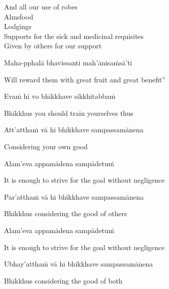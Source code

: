 \begin{english-verses}
  And all our use of robes\\
  Almsfood\\
  Lodgings\\
  Supports for the sick and medicinal requisites\makeatletter\hyperlink{endnote92-appendix}\makeatother\\
  Given by others for our support
\end{english-verses}

Maha-pphalā bhavissanti mah'ānisaṁsā'ti

\begin{english}
  Will reward them with great fruit and great benefit''
\end{english}

Evaṁ hi vo bhikkhave sikkhitabbaṁ

\begin{english}
  Bhikkhus you should train yourselves thus
\end{english}

Att'atthaṁ vā hi bhikkhave sampassamānena

\begin{english}
  Considering your own good
\end{english}

Alam'eva appamādena sampādetuṁ

\begin{english}
  It is enough to strive for the goal without negligence
\end{english}

Par'atthaṁ vā hi bhikkhave sampassamānena

\begin{english}
  Bhikkhus considering the good of others
\end{english}

Alam'eva appamādena sampādetuṁ

\begin{english}
  It is enough to strive for the goal without negligence
\end{english}

Ubhay'atthaṁ vā hi bhikkhave sampassamānena

\begin{english}
  Bhikkhus considering the good of both
\end{english}

